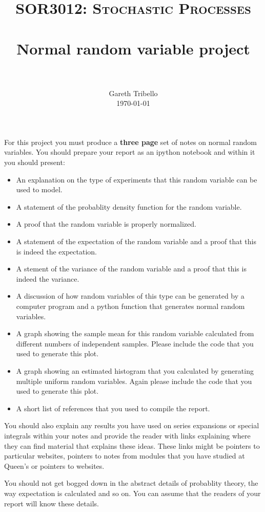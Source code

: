 \documentclass[paper=a4, fontsize=11pt]{scrartcl}
\title{\usefont{OT1}{bch}{b}{n} \normalfont \normalsize \textsc{SOR3012:
Stochastic Processes} \\ [25pt] \horrule{0.5pt} \\[0.4cm] 
\huge Normal random variable project \\
\horrule{2pt} \\[0.25cm]
}
\author{ \normalfont
\normalsize
        Gareth Tribello \\[-3pt] \normalsize
        \today
}
\date{}
\numberwithin{equation}{section}
\numberwithin{figure}{section}
\numberwithin{table}{section}
\begin{document}
\maketitle

For this project you must produce a {\bf three page} set of notes on normal random variables.  You should prepare your report as an ipython notebook and within it you should present:

\begin{itemize}
 \item An explanation on the type of experiments that this random variable can be used to model. 
 \item A statement of the probablity density function for the random variable.
 \item A proof that the random variable is properly normalized.
 \item A statement of the expectation of the random variable and a proof that this is indeed the expectation.
 \item A stement of the variance of the random variable and a proof that this is indeed the variance.
 \item A discussion of how random variables of this type can be generated by a computer program and a python function that generates normal random variables.
 \item A graph showing the sample mean for this random variable calculated from different numbers of independent samples.  Please include the code that you used to generate this plot.
 \item A graph showing an estimated histogram that you calculated by generating multiple uniform random variables.  Again please include the code that you used to generate this plot.
 \item A short list of references that you used to compile the report.
\end{itemize}

You should also explain any results you have used on series expansions or special integrals within your notes and provide the reader with links explaining where they can find material that explains 
these ideas.  These links might be pointers to particular websites, pointers to notes from modules that you have studied at Queen's or pointers to websites.

You should not get bogged down in the abstract details of probablity theory, the way expectation is calculated and so on.  You can assume that the readers of your report will know these details.
\end{document}
